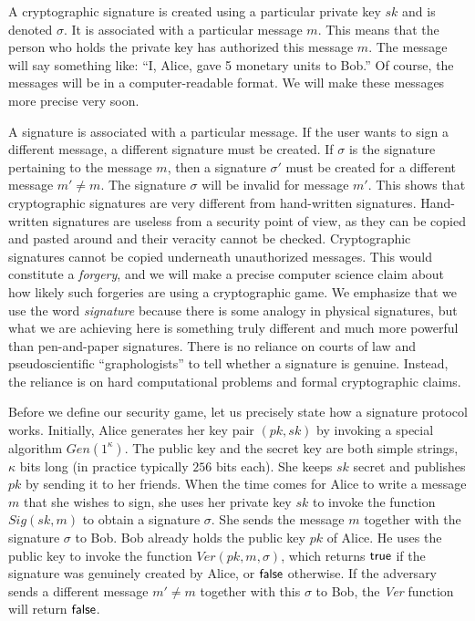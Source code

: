 A cryptographic signature is created using a particular private key $sk$ and is
denoted
$\sigma$.
It is associated with a particular message $m$. This means that
the person who holds the private key has authorized this message $m$. The message
will say something like: ``I, Alice, gave 5 monetary units to Bob.'' Of course, the
messages will be in a computer-readable format. We will make these messages more
precise very soon.

A signature is associated with a particular message. If the user wants to sign a
different message, a different signature must be created. If $\sigma$ is the signature
pertaining to the message $m$, then a signature $\sigma'$ must be created for a
different message $m' \neq m$. The signature $\sigma$ will be invalid for message $m'$.
This shows that cryptographic signatures are very different from hand-written signatures.
Hand-written signatures are useless from a security point of view, as they can be
copied and pasted around and their veracity cannot be checked. Cryptographic
signatures cannot be copied underneath unauthorized messages. This would constitute
a \emph{forgery}, and we will make a precise computer science claim about how
likely such forgeries are using a cryptographic game. We emphasize that we use the
word \emph{signature} because there is some analogy in physical signatures, but
what we are achieving here is something truly different and much more powerful
than pen-and-paper signatures. There is no reliance on courts of law and pseudoscientific
``graphologists'' to tell whether a signature is genuine. Instead, the reliance is
on hard computational problems and formal cryptographic claims.

Before we define our security game, let us precisely state how a signature protocol
works. Initially, Alice generates her key pair $(pk, sk)$ by invoking a special algorithm
$Gen(1^\kappa)$. The public key and the secret key are both simple strings, $\kappa$
bits long (in practice typically $256$ bits each).
She keeps $sk$ secret and publishes $pk$ by
sending it to her friends. When the time comes for Alice to write a message $m$
that she wishes to sign, she uses her private key $sk$ to invoke the function
$Sig(sk, m)$
to obtain a signature $\sigma$. She sends the message $m$ together
with the signature $\sigma$ to Bob. Bob already holds the public key $pk$ of Alice.
He uses the public key to invoke the function
$Ver(pk, m, \sigma)$,
which returns
$\textsf{true}$ if the signature was genuinely created by Alice, or $\textsf{false}$ otherwise.
If the adversary sends a different message $m' \neq m$ together with this $\sigma$
to Bob, the \emph{Ver} function will return $\textsf{false}$.

